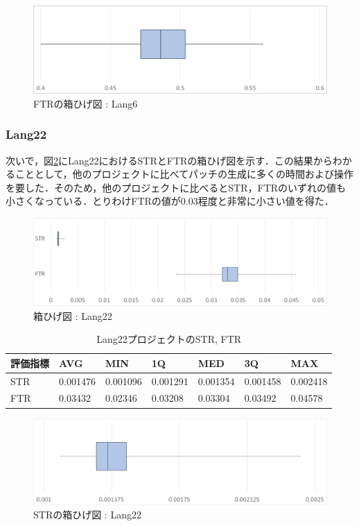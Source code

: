 \documentclass[uplatex,dvipdfmx,a4paper]{jsarticle}
\begin{document}
\begin{figure}[t]
  \centering
  \includegraphics[width=\linewidth]{fig/Lang6_boxplot_FTR.png}
  \caption{FTRの箱ひげ図 : Lang6}
  \label{fig:Lang6_boxplot_FTR}
\end{figure}
\subsubsection{Lang22}
次いで，図\ref{fig:Lang22_boxplot}にLang22におけるSTRとFTRの箱ひげ図を示す．この結果からわかることとして，他のプロジェクトに比べてパッチの生成に多くの時間および操作を要した．そのため，他のプロジェクトに比べるとSTR，FTRのいずれの値も小さくなっている．とりわけFTRの値が0.03程度と非常に小さい値を得た．
\begin{figure}[t]
  \centering
  \includegraphics[width=\linewidth]{fig/Lang22_boxplot.png}
  \caption{箱ひげ図 : Lang22}
  \label{fig:Lang22_boxplot}
\end{figure}
\begin{table}[b]
  \centering
  \caption{Lang22プロジェクトのSTR, FTR}
  \label{tab:Lang22}
  \begin{tabular}{l|llllll} \hline\hline
    評価指標 & AVG         & MIN & 1Q & MED & 3Q & MAX   \\\hline
    STR & 0.001476 & 0.001096 & 0.001291 & 0.001354 & 0.001458 & 0.002418  \\
    FTR & 0.03432 & 0.02346 & 0.03208 & 0.03304 & 0.03492 & 0.04578 \\\hline\hline
  \end{tabular}
\end{table}
\begin{figure}[t]
  \centering
  \includegraphics[width=\linewidth]{fig/Lang22_boxplot_STR.png}
  \caption{STRの箱ひげ図 : Lang22}
  \label{fig:Lang22_boxplot_STR}
\end{figure}
\end{document}
